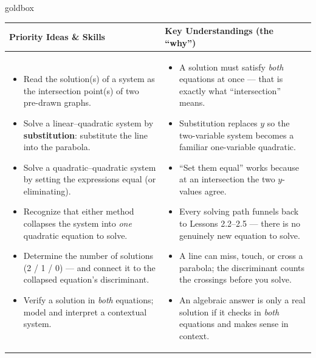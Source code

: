\documentclass[10pt]{article}
\begin{document}
\renewcommand{\arraystretch}{1.4}
\begin{skillbox}{goldbox}
\begin{tabularx}{\linewidth}{@{}X|X@{}}
\textbf{Priority Ideas \& Skills} & \textbf{Key Understandings (the ``why'')} \\[2pt]
\hline
\vspace{-6pt}
\begin{itemize}[leftmargin=1.1em, nosep, after=\vspace{2pt}]
  \item Read the solution(s) of a system as the intersection point(s) of two pre-drawn graphs.
  \item Solve a linear--quadratic system by \textbf{substitution}: substitute the line into the parabola.
  \item Solve a quadratic--quadratic system by setting the expressions equal (or eliminating).
  \item Recognize that either method collapses the system into \emph{one} quadratic equation to solve.
  \item Determine the number of solutions (2 / 1 / 0) --- and connect it to the collapsed equation's discriminant.
  \item Verify a solution in \emph{both} equations; model and interpret a contextual system.
\end{itemize}
&
\vspace{-6pt}
\begin{itemize}[leftmargin=1.1em, nosep, after=\vspace{2pt}]
  \item A solution must satisfy \emph{both} equations at once --- that is exactly what ``intersection'' means.
  \item Substitution replaces $y$ so the two-variable system becomes a familiar one-variable quadratic.
  \item ``Set them equal'' works because at an intersection the two $y$-values agree.
  \item Every solving path funnels back to Lessons 2.2--2.5 --- there is no genuinely new equation to solve.
  \item A line can miss, touch, or cross a parabola; the discriminant counts the crossings before you solve.
  \item An algebraic answer is only a real solution if it checks in \emph{both} equations and makes sense in context.
\end{itemize}
\end{tabularx}
\end{skillbox}
\end{document}

